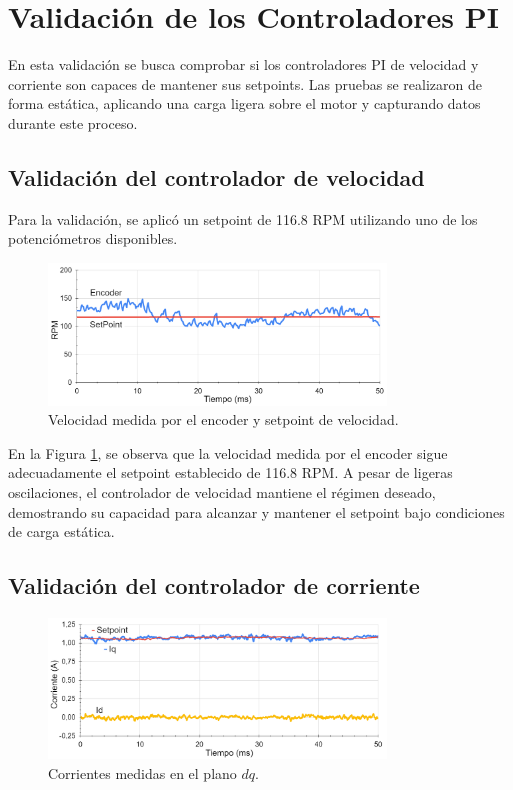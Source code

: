 \documentclass[11pt]{report}
\begin{document}
\newpage
\section{Validación de los Controladores PI}
En esta validación se busca comprobar si los controladores PI de velocidad y corriente son capaces de mantener sus setpoints. Las pruebas se realizaron de forma estática, aplicando una carga ligera sobre el motor y capturando datos durante este proceso.

\subsection{Validación del controlador de velocidad}
Para la validación, se aplicó un setpoint de 116.8 RPM utilizando uno de los potenciómetros disponibles.

\begin{figure}[ht]
	\centering
	\includegraphics[width=0.8\textwidth]{imagenes/graficas/CV.png}
	\caption{Velocidad medida por el encoder y setpoint de velocidad.}
	\label{velocidad_encoder}
\end{figure}
\FloatBarrier

En la Figura \ref{velocidad_encoder}, se observa que la velocidad medida por el encoder sigue adecuadamente el setpoint establecido de 116.8 RPM. A pesar de ligeras oscilaciones, el controlador de velocidad mantiene el régimen deseado, demostrando su capacidad para alcanzar y mantener el setpoint bajo condiciones de carga estática.

\newpage
\subsection{Validación del controlador de corriente}

\begin{figure}[ht]
	\centering
	\includegraphics[width=0.8\textwidth]{imagenes/graficas/CV_CC.png}
	\caption{Corrientes medidas en el plano $dq$.}
	\label{cont_corrientes_dq}
\end{figure}
\FloatBarrier
\end{document}
